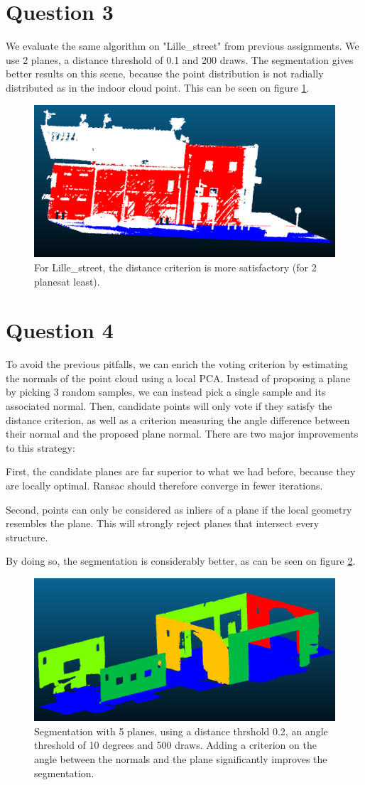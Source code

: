 \documentclass[a4paper]{article}
\begin{document}
\section*{Question 3}

We evaluate the same algorithm on "Lille_street" from previous assignments. We use 2 planes, a distance threshold of 0.1 and 200 draws.
The segmentation gives better results on this scene, because the point distribution is not radially distributed as in the indoor cloud point. This can be seen on figure \ref{fig:Q3}.

\begin{figure}[ht]
    \centering
    \includegraphics[width=0.3\linewidth]{figures/Q3.png}
    \caption{For Lille_street, the distance criterion is more satisfactory (for 2 planesat least).}
    \label{fig:Q3}
\end{figure}

\section*{Question 4}

To avoid the previous pitfalls, we can enrich the voting criterion by estimating the normals of the point cloud using a local PCA. Instead of proposing
a plane by picking 3 random samples, we can instead pick a single sample and its associated normal. Then, candidate points will only vote if they satisfy the distance criterion, as well
as a criterion measuring the angle difference between their normal and the proposed plane normal.
There are two major improvements to this strategy:
\item First, the candidate planes are far superior to what we had before, because they are locally optimal. Ransac should therefore converge in fewer iterations.
\item Second, points can only be considered as inliers of a plane if the local geometry resembles the plane. This will strongly reject planes that intersect every structure.

By doing so, the segmentation is considerably better, as can be seen on figure \ref{fig:Q4}.

\begin{figure}[ht]
    \centering
    \includegraphics[width=0.3\linewidth]{figures/Q4.png}
    \caption{Segmentation with 5 planes, using a distance thrshold 0.2, an angle threshold of 10 degrees and 500 draws.
    Adding a criterion on the angle between the normals and the plane significantly improves the segmentation.}
    \label{fig:Q4}
\end{figure}
\end{document}
